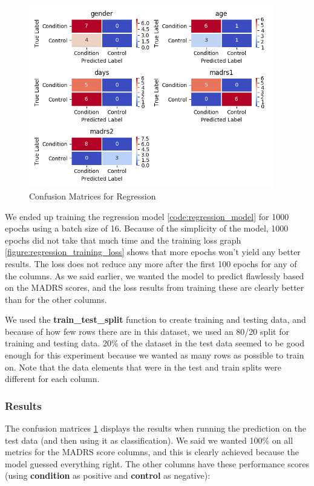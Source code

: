 \begin{figure}
      \includegraphics[height=8cm]{img/regression/confusion_kerasregressor_grouped.png}
      \caption{Confusion Matrices for Regression}
      \label{figure:regression_test_confusion}
\end{figure}

We ended up training the regression model \ref{code:regression_model} for 1000 epochs using a batch size of 16. Because of the simplicity of the model, 
1000 epochs did not take that much time and the training loss graph \ref{figure:regression_training_loss} shows that more epochs won't yield any better results. 
The loss does not reduce any more after the first 100 epochs for any of the columns. As we said earlier, we wanted the model to predict 
flawlessly based on the MADRS scores, and the loss results from training these are clearly better than for the other columns. 

We used the \textbf{train\_test\_split} function to create training and testing data, and because of how few rows there are in this dataset, 
we used an 80/20 split for training and testing data. 20\% of the dataset in the test data seemed to be good enough for this experiment 
because we wanted as many rows as possible to train on. Note that the data elements that were in the test and train splits were different for each column. 

\subsubsection{Results}

The confusion matrices \ref{figure:regression_test_confusion} displays the results when running the prediction on the test data (and then using it as classification). 
We said we wanted 100\% on all metrics for the MADRS score columns, and this is clearly achieved because the model guessed everything right. 
The other columns have these performance scores (using \textbf{condition} as positive and \textbf{control} as negative):

